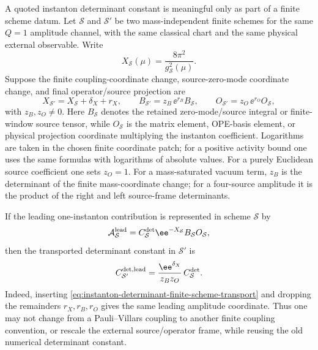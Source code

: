\begin{controlledapproximation}
\label{ca:instanton-determinant-scheme-transport}
A quoted instanton determinant constant is meaningful only as part of a
finite scheme datum.  Let \(\mathcal S\) and \(\mathcal S'\) be two
mass-independent finite schemes for the same \(Q=1\) amplitude channel, with
the same classical chart and the same physical external observable.  Write
\[
  X_{\mathcal S}(\mu)=\frac{8\pi^2}{g_{\mathcal S}^2(\mu)} .
\]
Suppose the finite coupling-coordinate change, source-zero-mode coordinate
change, and final operator/source projection are
\begin{equation}
  X_{\mathcal S'}=X_{\mathcal S}+\delta_X+r_X,\qquad
  B_{\mathcal S'}=z_B\,\ee^{r_B}B_{\mathcal S},\qquad
  O_{\mathcal S'}=z_O\,\ee^{r_O}O_{\mathcal S},
  \label{eq:instanton-finite-scheme-map}
\end{equation}
with \(z_B,z_O\ne0\).  Here \(B_{\mathcal S}\) denotes the retained
zero-mode/source integral or finite-window source tensor, while
\(O_{\mathcal S}\) is the matrix element, OPE-basis element, or physical
projection coordinate multiplying the instanton coefficient.  Logarithms are
taken in the chosen finite coordinate patch; for a positive activity bound one
uses the same formulas with logarithms of absolute values.  For a purely
Euclidean source coefficient one sets \(z_O=1\).  For a mass-saturated vacuum
term, \(z_B\) is the determinant of the finite mass-coordinate change; for a
four-source amplitude it is the product of the right and left source-frame
determinants.

If the leading one-instanton contribution is represented in scheme
\(\mathcal S\) by
\[
  \mathcal A_{\mathcal S}^{\rm lead}
  =
  C_{\mathcal S}^{\rm det}
  \ee^{-X_{\mathcal S}}
  B_{\mathcal S}O_{\mathcal S},
\]
then the transported determinant constant in \(\mathcal S'\) is
\begin{equation}
  C_{\mathcal S'}^{\rm det,lead}
  =
  \frac{\ee^{\delta_X}}{z_Bz_O}\,
  C_{\mathcal S}^{\rm det}.
  \label{eq:instanton-determinant-finite-scheme-transport}
\end{equation}
Indeed, inserting
\eqref{eq:instanton-determinant-finite-scheme-transport} and dropping the
remainders \(r_X,r_B,r_O\) gives the same leading amplitude coordinate.
Thus one may not change from a Pauli--Villars coupling to another finite
coupling convention, or rescale the external source/operator frame, while
reusing the old numerical determinant constant.


\end{controlledapproximation}
